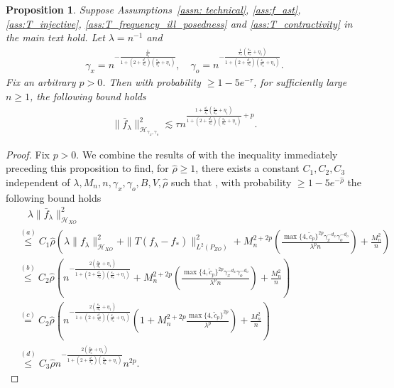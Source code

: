 \documentclass[11pt]{article}
\newcommand{\calH}{\mathcal{H}}
\newcommand{\0}{\mathbf{0}}
\newtheorem{prop}{Proposition}[section]
\begin{document}
\begin{appendix}
\begin{prop}
\label{lem:f_bar_lambda_norm_bound}
Suppose Assumptions~\ref{assn: technical}, \ref{ass:f_ast}, \ref{ass:T_injective}, \ref{ass:T_frequency_ill_posedness} and \ref{ass:T_contractivity} in the main text hold. 
Let $\lambda = n^{-1}$ and 
\begin{align*}
    \gamma_x = n^{-\frac{\frac{1}{d_x}}{1+(2+\frac{d_o}{s_o})(\frac{s_x}{d_x}+\eta_1)}}, \quad \gamma_o = n^{-\frac{\frac{1}{s_o}(\frac{s_x}{d_x}+\eta_1)}{1+(2+\frac{d_o}{s_o})(\frac{s_x}{d_x}+\eta_1)}}. 
\end{align*} Fix an arbitrary $p>0$. Then with probability $\geq 1-5e^{-\tau}$, for sufficiently large $n\geq 1$, the following bound holds
    \begin{align*}
        \|\bar{f}_{\lambda}\|^2_{\calH_{\gamma_x,\gamma_o}}\lesssim \tau n^{\frac{1 + \frac{d_o}{s_o}(\frac{s_x}{d_x}+\eta_1)}{1 + (2 + \frac{d_o}{s_o})(\frac{s_x}{d_x} + \eta_1)} + p}.
    \end{align*}
\end{prop}
\begin{proof}
Fix $p>0$. We combine the results of  with the inequality immediately preceding this proposition to find, for $\hat{\rho}\geq 1$, there exists a constant $C_1, C_2, C_3$ independent of $\lambda, M_n, n, \gamma_x, \gamma_o, B, V, \hat{\rho}$ such that , with probability $\geq 1 - 5e^{-\hat{\rho}}$ the following bound holds
    \begin{align*}
        &\quad \lambda \|\bar{f}_{\lambda}\|^2_{\calH_{XO}} \\
        &\stackrel{(a)}{\leq} C_1\hat{\rho}\left(\lambda \|f_{\lambda}\|^2_{\calH_{XO}} + \|T(f_{\lambda} - f_{\ast})\|^2_{L^2(P_{ZO})} + M_n^{2+2p}\left(\frac{\max\{4, \tilde{c}_p\}^{2p}\gamma_x^{-d_x}\gamma_o^{-d_o}}{\lambda^{p}n}\right) + \frac{M_n^2}{n}\right)\\
        &\stackrel{(b)}{\leq}  C_2\hat{\rho}\left(n^{-\frac{2(\frac{s_x}{d_x}+\eta_1)}{1+(2+\frac{d_o}{s_o})(\frac{s_x}{d_x}+\eta_1)}} + M_n^{2+2p}\left(\frac{\max\{4, \tilde{c}_p\}^{2p}\gamma_x^{-d_x}\gamma_o^{-d_o}}{\lambda^{p}n}\right) + \frac{M_n^2}{n}\right)\\
        &\stackrel{(c)}{=} C_2\hat{\rho}\left(n^{-\frac{2(\frac{s_x}{d_x}+\eta_1)}{1+(2+\frac{d_o}{s_o})(\frac{s_x}{d_x}+\eta_1)}}\left(1 + M_n^{2+2p}\frac{\max\{4, \tilde{c}_p\}^{2p}}{\lambda^{p}}\right) + \frac{M_n^2}{n}\right)\\
        &\stackrel{(d)}{\leq}C_3 \hat{\rho}n^{-\frac{2(\frac{s_x}{d_x}+\eta_1)}{1+(2+\frac{d_o}{s_o})(\frac{s_x}{d_x}+\eta_1)}} n^{2p}.

\end{align*}
\end{proof}
\end{appendix}
\end{document}
